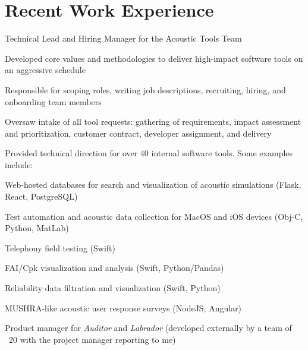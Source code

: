 \documentclass[]{jhearn-resume}
\begin{document}
\begin{minipage}[t]{0.64\textwidth}
\section{Recent Work Experience}
\vspace{\topsep} %
\begin{tightemize}
\item Technical Lead and Hiring Manager for the Acoustic Tools Team
\item Developed core values and methodologies to deliver high-impact software tools on an aggressive schedule
\item Responsible for scoping roles, writing job descriptions, recruiting, hiring, and onboarding team members
\item Oversaw intake of all tool requests: gathering of requirements, impact assessment and prioritization, customer contract, developer assignment, and delivery   
\item Provided technical direction for over 40 internal software tools. Some examples include:
	\begin{tightemize}
	\vspace{\topsep}
	\item Web-hosted databases for search and visualization of acoustic simulations (Flask, React, PostgreSQL)
	\item Test automation and acoustic data collection for MacOS and iOS devices (Obj-C, Python, MatLab)
	\item Telephony field testing (Swift)
	\item FAI/Cpk visualization and analysis (Swift, Python/Pandas)
	\item Reliability data filtration and visualization (Swift, Python)
	\item MUSHRA-like acoustic user response surveys (NodeJS, Angular)
	\end{tightemize}
	\vspace{\topsep}
\item Product manager for \emph{Auditor} and \emph{Labrador} (developed externally by a team of ~20 with the project manager reporting to me)

\end{tightemize}
\end{minipage}
\end{document}
